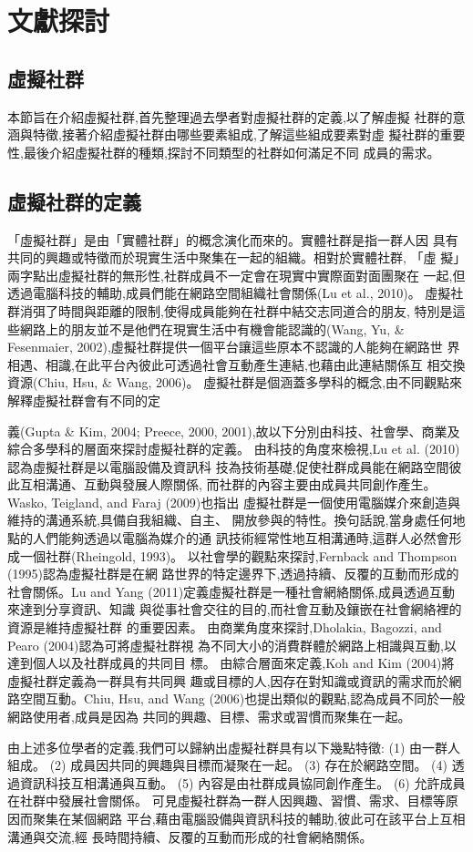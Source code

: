 \chapter{文獻探討}


\section{虛擬社群}

本節旨在介紹虛擬社群,首先整理過去學者對虛擬社群的定義,以了解虛擬
社群的意涵與特徵,接著介紹虛擬社群由哪些要素組成,了解這些組成要素對虛
擬社群的重要性,最後介紹虛擬社群的種類,探討不同類型的社群如何滿足不同
成員的需求。


\section{虛擬社群的定義}
「虛擬社群」是由「實體社群」的概念演化而來的。實體社群是指一群人因
具有共同的興趣或特徵而於現實生活中聚集在一起的組織。相對於實體社群,
「虛
擬」兩字點出虛擬社群的無形性,社群成員不一定會在現實中實際面對面團聚在
一起,但透過電腦科技的輔助,成員們能在網路空間組織社會關係(Lu et al., 2010)。
虛擬社群消弭了時間與距離的限制,使得成員能夠在社群中結交志同道合的朋友,
特別是這些網路上的朋友並不是他們在現實生活中有機會能認識的(Wang, Yu, &
Fesenmaier, 2002),虛擬社群提供一個平台讓這些原本不認識的人能夠在網路世
界相遇、相識,在此平台內彼此可透過社會互動產生連結,也藉由此連結關係互
相交換資源(Chiu, Hsu, & Wang, 2006)。
虛擬社群是個涵蓋多學科的概念,由不同觀點來解釋虛擬社群會有不同的定

義(Gupta & Kim, 2004; Preece, 2000, 2001),故以下分別由科技、社會學、商業及
綜合多學科的層面來探討虛擬社群的定義。
由科技的角度來檢視,Lu et al. (2010)認為虛擬社群是以電腦設備及資訊科
技為技術基礎,促使社群成員能在網路空間彼此互相溝通、互動與發展人際關係,
而社群的內容主要由成員共同創作產生。Wasko, Teigland, and Faraj (2009)也指出
虛擬社群是一個使用電腦媒介來創造與維持的溝通系統,具備自我組織、自主、
開放參與的特性。換句話說,當身處任何地點的人們能夠透過以電腦為媒介的通
訊技術經常性地互相溝通時,這群人必然會形成一個社群(Rheingold, 1993)。
以社會學的觀點來探討,Fernback and Thompson (1995)認為虛擬社群是在網
路世界的特定邊界下,透過持續、反覆的互動而形成的社會關係。Lu and Yang
(2011)定義虛擬社群是一種社會網絡關係,成員透過互動來達到分享資訊、知識
與從事社會交往的目的,而社會互動及鑲嵌在社會網絡裡的資源是維持虛擬社群
的重要因素。
由商業角度來探討,Dholakia, Bagozzi, and Pearo (2004)認為可將虛擬社群視
為不同大小的消費群體於網路上相識與互動,以達到個人以及社群成員的共同目
標。
由綜合層面來定義,Koh and Kim (2004)將虛擬社群定義為一群具有共同興
趣或目標的人,因存在對知識或資訊的需求而於網路空間互動。Chiu, Hsu, and
Wang (2006)也提出類似的觀點,認為成員不同於一般網路使用者,成員是因為
共同的興趣、目標、需求或習慣而聚集在一起。


由上述多位學者的定義,我們可以歸納出虛擬社群具有以下幾點特徵:
(1) 由一群人組成。
(2) 成員因共同的興趣與目標而凝聚在一起。
(3) 存在於網路空間。
(4) 透過資訊科技互相溝通與互動。
(5) 內容是由社群成員協同創作產生。
(6) 允許成員在社群中發展社會關係。
可見虛擬社群為一群人因興趣、習慣、需求、目標等原因而聚集在某個網路
平台,藉由電腦設備與資訊科技的輔助,彼此可在該平台上互相溝通與交流,經
長時間持續、反覆的互動而形成的社會網絡關係。






\section{}

